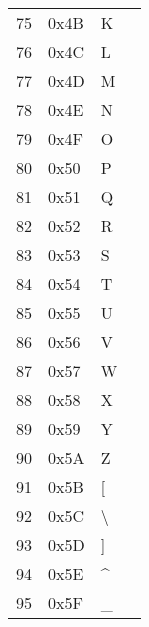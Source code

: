 \documentclass[11pt,fleqn]{book} %
\begin{document}
{\begin{table}[]
\begin{tabular}{|l|l|l|l|}
75            & 0x4B      & K          & \\
76            & 0x4C      & L          & \\
77            & 0x4D      & M          & \\
78            & 0x4E      & N          & \\
79            & 0x4F      & O          & \\
80            & 0x50      & P          & \\
81            & 0x51      & Q          & \\
82            & 0x52      & R          & \\
83            & 0x53      & S          & \\
84            & 0x54      & T          & \\
85            & 0x55      & U          & \\
86            & 0x56      & V          & \\
87            & 0x57      & W          & \\
88            & 0x58      & X          & \\
89            & 0x59      & Y          & \\
90            & 0x5A      & Z          & \\
91            & 0x5B      & [          & \\
92            & 0x5C      & \textbackslash          & \\
93            & 0x5D      & ]          & \\
94            & 0x5E      & \^{}          & \\
95            & 0x5F      & \_          & \\


\hline
\end{tabular}
\end{table}


}
\end{document}
